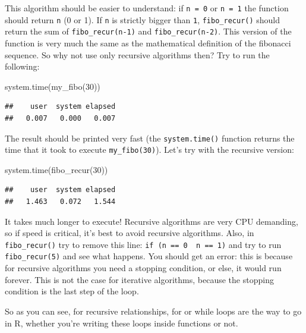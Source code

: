 \documentclass[
]{article}
\newenvironment{Shaded}{\begin{snugshade}}{\end{snugshade}}
\newcommand{\DecValTok}[1]{\textcolor[rgb]{0.00,0.00,0.81}{#1}}
\newcommand{\FunctionTok}[1]{\textcolor[rgb]{0.00,0.00,0.00}{#1}}
\newcommand{\NormalTok}[1]{#1}
\begin{document}
This algorithm should be easier to understand: if \texttt{n\ =\ 0} or \texttt{n\ =\ 1} the function should return \texttt{n}
(0 or 1). If \texttt{n} is strictly bigger than \texttt{1}, \texttt{fibo\_recur()} should return the sum of
\texttt{fibo\_recur(n-1)} and \texttt{fibo\_recur(n-2)}. This version of the function is very much the same as the
mathematical definition of the fibonacci sequence. So why not use only recursive algorithms
then? Try to run the following:

\begin{Shaded}
\begin{Highlighting}[]
\FunctionTok{system.time}\NormalTok{(}\FunctionTok{my\_fibo}\NormalTok{(}\DecValTok{30}\NormalTok{))}
\end{Highlighting}
\end{Shaded}

\begin{verbatim}
##    user  system elapsed 
##   0.007   0.000   0.007
\end{verbatim}

The result should be printed very fast (the \texttt{system.time()} function returns the time that it took
to execute \texttt{my\_fibo(30)}). Let's try with the recursive version:

\begin{Shaded}
\begin{Highlighting}[]
\FunctionTok{system.time}\NormalTok{(}\FunctionTok{fibo\_recur}\NormalTok{(}\DecValTok{30}\NormalTok{))}
\end{Highlighting}
\end{Shaded}

\begin{verbatim}
##    user  system elapsed 
##   1.463   0.072   1.544
\end{verbatim}

It takes much longer to execute! Recursive algorithms are very CPU demanding, so if speed is
critical, it's best to avoid recursive algorithms. Also, in \texttt{fibo\_recur()} try to remove this line:
\texttt{if\ (n\ ==\ 0\ \textbar{}\textbar{}\ n\ ==\ 1)} and try to run \texttt{fibo\_recur(5)} and see what happens. You should
get an error: this is because for recursive algorithms you need a stopping condition, or else,
it would run forever. This is not the case for iterative algorithms, because the stopping
condition is the last step of the loop.

So as you can see, for recursive relationships, for or while loops are the way to go in R, whether
you're writing these loops inside functions or not.
\end{document}
